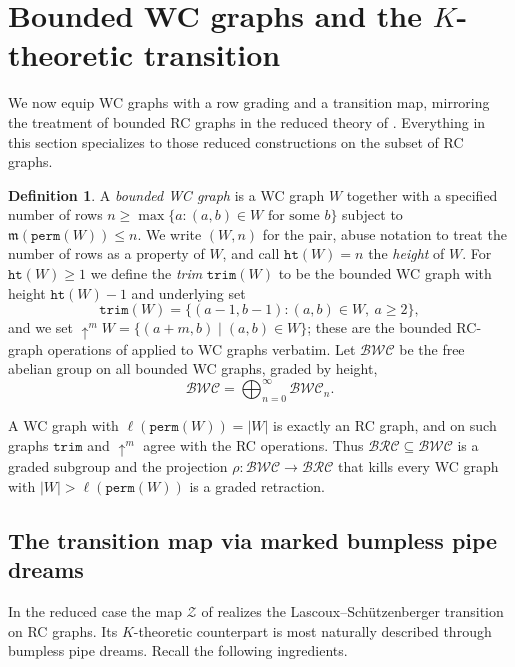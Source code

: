 \documentclass{amsart}
\theoremstyle{definition}
\newtheorem{definition}[lemma]{Definition}
\theoremstyle{remark}
\numberwithin{equation}{subsection}
\newcommand{\shup}{{\uparrow}}
\newcommand{\wof}[1]{\mathtt{perm}(#1)}
\newcommand{\trm}{\mathtt{trim}}
\newcommand{\zeromap}{\mathcal{Z}}
\newcommand{\hr}{\mathtt{ht}}
\newcommand{\BRC}{\mathcal{BRC}}
\newcommand{\BWC}{\mathcal{BWC}}
\newcommand{\maxd}{\mathfrak{m}}
\begin{document}
\section{Bounded WC graphs and the \texorpdfstring{$K$}{K}-theoretic transition}
\label{section:kzero}

We now equip WC graphs with a row grading and a transition map, mirroring the
treatment of bounded RC graphs in the reduced theory of \cite{samuelmolev}.
Everything in this section specializes to those reduced constructions on the
subset of RC graphs.

\begin{definition}\label{definition:bwc}
A \emph{bounded WC graph} is a WC graph $W$ together with a specified number of
rows $n\geq \max\{a: (a,b)\in W\text{ for some }b\}$ subject to
$\maxd(\wof{W})\leq n$. We write $(W,n)$ for the pair, abuse notation to treat
the number of rows as a property of $W$, and call $\hr(W)=n$ the \emph{height}
of $W$. For $\hr(W)\geq 1$ we define the \emph{trim} $\trm(W)$ to be the bounded
WC graph with height $\hr(W)-1$ and underlying set
$$\trm(W)=\{(a-1,b-1): (a,b)\in W,\ a\geq 2\},$$
and we set $\shup^m W=\{(a+m,b)\mid (a,b)\in W\}$; these are the bounded RC-graph
operations of \cite{samuelmolev} applied to WC graphs verbatim. Let $\BWC$ be
the free abelian group on all bounded WC graphs, graded by height,
$$\BWC=\bigoplus_{n=0}^{\infty}\BWC_n.$$
\end{definition}

A WC graph with $\ell(\wof{W})=|W|$ is exactly an RC graph, and on such graphs
$\trm$ and $\shup^m$ agree with the RC operations. Thus $\BRC\subseteq\BWC$ is a
graded subgroup and the projection $\rho:\BWC\to\BRC$ that kills every WC graph
with $|W|>\ell(\wof{W})$ is a graded retraction.

\subsection{The transition map via marked bumpless pipe dreams}

In the reduced case the map $\zeromap$ of \cite{samuelmolev} realizes the
Lascoux--Sch\"utzenberger transition on RC graphs. Its $K$-theoretic counterpart
is most naturally described through bumpless pipe dreams. Recall the following
ingredients.
\end{document}
